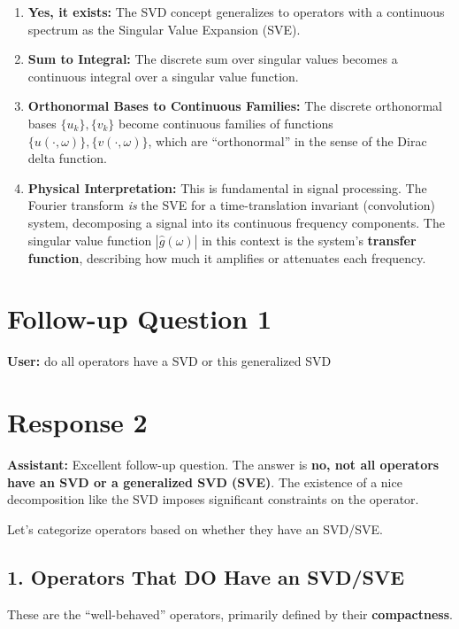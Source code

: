 \documentclass[aps,prl,reprint]{revtex4-2}
\begin{document}
\begin{enumerate}
\item \textbf{Yes, it exists:} The SVD concept generalizes to operators with
a continuous spectrum as the Singular Value Expansion (SVE).

\item \textbf{Sum to Integral:} The discrete sum over singular values
becomes a continuous integral over a singular value function.

\item \textbf{Orthonormal Bases to Continuous Families:} The discrete
orthonormal bases $\{u_k\}, \{v_k\}$ become continuous families of functions 
$\{u(\cdot, \omega)\}, \{v(\cdot, \omega)\}$, which are ``orthonormal'' in
the sense of the Dirac delta function.

\item \textbf{Physical Interpretation:} This is fundamental in signal
processing. The Fourier transform \textit{is} the SVE for a time-translation
invariant (convolution) system, decomposing a signal into its continuous
frequency components. The singular value function $|\hat{g}(\omega)|$ in
this context is the system's \textbf{transfer function}, describing how much
it amplifies or attenuates each frequency.
\end{enumerate}

\section*{Follow-up Question 1}

\textbf{User:} do all operators have a SVD or this generalized SVD

\section*{Response 2}

\textbf{Assistant:} Excellent follow-up question. The answer is \textbf{no,
not all operators have an SVD or a generalized SVD (SVE)}. The existence of
a nice decomposition like the SVD imposes significant constraints on the
operator.

Let's categorize operators based on whether they have an SVD/SVE.

\subsection*{1. Operators That DO Have an SVD/SVE}

These are the ``well-behaved'' operators, primarily defined by their \textbf{%
compactness}.
\end{document}
